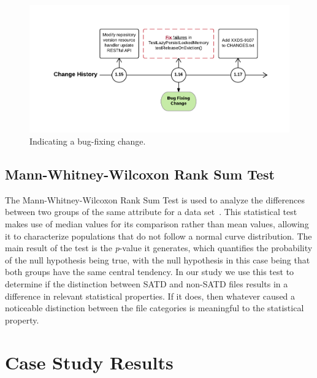 \begin{figure}[h]
	\centering
	\includegraphics[width=150mm]{figures/chapter3/bug-fixing-change}
	\caption{Indicating a bug-fixing change.}
	\label{fig:indicating-a-bug-fixing-change}
\end{figure}


\subsection{Mann-Whitney-Wilcoxon Rank Sum Test}
\label{ch3_wilcox}
The Mann-Whitney-Wilcoxon Rank Sum Test is used to analyze the differences between two groups of the same attribute for a data set~\cite{mann1947test}. This statistical test makes use of median values for its comparison rather than mean values, allowing it to characterize populations that do not follow a normal curve distribution. The main result of the test is the \textit{p}-value it generates, which quantifies the probability of the null hypothesis being true, with the null hypothesis in this case being that both groups have the same central tendency. In our study we use this test to determine if the distinction between SATD and non-SATD files results in a difference in relevant statistical properties. If it does, then whatever caused a noticeable distinction between the file categories is meaningful to the statistical property. 


\section{Case Study Results}
\label{chap3:sec:results}

